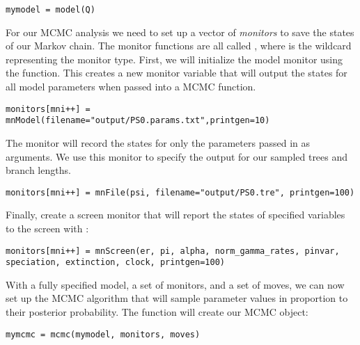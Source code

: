 {\tt \begin{snugshade*}
\begin{lstlisting}
mymodel = model(Q)
\end{lstlisting}
\end{snugshade*}}

For our MCMC analysis we need to set up a vector of \textit{monitors} to save the states of our Markov chain. 
The monitor functions are all called , where \cl{*} is the wildcard representing the monitor type.
First, we will initialize the model monitor using the  function. This creates a new monitor variable that will output the states for all model parameters when passed into a MCMC function. 
{\tt \begin{snugshade*}
\begin{lstlisting}
monitors[mni++] = mnModel(filename="output/PS0.params.txt",printgen=10)
\end{lstlisting}
\end{snugshade*}}

The  monitor will record the states for only the parameters passed in as arguments. We use this monitor to specify the output for our sampled trees and branch lengths.

{\tt \begin{snugshade*}
\begin{lstlisting}
monitors[mni++] = mnFile(psi, filename="output/PS0.tre", printgen=100)
\end{lstlisting}
\end{snugshade*}}

Finally, create a screen monitor that will report the states of specified variables to the screen with :
{\tt \begin{snugshade*}
\begin{lstlisting}
monitors[mni++] = mnScreen(er, pi, alpha, norm_gamma_rates, pinvar, speciation, extinction, clock, printgen=100)
\end{lstlisting}
\end{snugshade*}}

With a fully specified model, a set of monitors, and a set of moves, we can now set up the MCMC algorithm that will sample parameter values in proportion to their posterior probability. The  function will create our MCMC object:
{\tt \begin{snugshade*}
\begin{lstlisting}
mymcmc = mcmc(mymodel, monitors, moves)
\end{lstlisting}
\end{snugshade*}}

